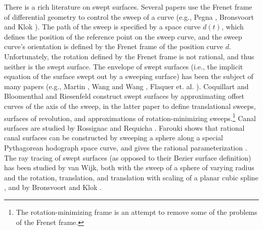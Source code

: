 There is a rich literature on swept surfaces.
Several papers use the Frenet frame of differential geometry
to control the sweep of a curve (e.g., Pegna \cite{pegna88},
Bronsvoort and Klok \cite{bronsklok85}).
The path of the sweep is specified by a space curve $d(t)$,
which defines the position of the reference point on the
sweep curve, and the sweep curve's orientation is defined by
the Frenet frame of the position curve $d$.
Unfortunately, the rotation defined by the Frenet frame is not rational,
and thus neither is the swept surface.  %
The envelope of swept surfaces (i.e., the implicit equation of the surface
swept out by a sweeping surface) has been the subject of many papers
(e.g., Martin \cite{martinsteph90}, Wang and Wang \cite{wangwang86},
Flaquer et. al. \cite{flaquer92}).
Coquillart \cite{coquillart87} and Bloomenthal and Riesenfeld 
\cite{bloom91} construct swept surfaces by approximating offset curves
of the axis of the sweep, in the latter paper to define translational sweeps,
surfaces of revolution, and approximations of rotation-minimizing 
sweeps.\footnote{The rotation-minimizing frame 
        is an attempt to remove some of the problems of the Frenet frame.}
Canal surfaces are studied by Rossignac and Requicha 
\cite{rossrequicha84,rossignac85}.
Farouki shows that rational canal surfaces can be constructed by sweeping
a sphere along a special Pythagorean hodograph space curve, and gives the
rational parameterization \cite{farouki94}.
The ray tracing of swept surfaces (as opposed to their Bezier surface 
definition) has been studied by van Wijk, both with the sweep of a sphere
of varying radius \cite{vanwijk84euro} and the rotation, translation,
and translation with scaling of a planar cubic spline \cite{vanwijk84tog},
and by Bronsvoort and Klok \cite{bronsklok85}.

